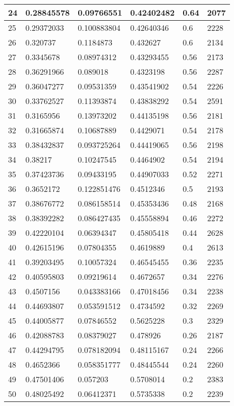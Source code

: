 \begin{longtable}{|l|l|l|l|l|l|}
24 & 0.28845578 & 0.09766551 & 0.42402482 & 0.64 & 2077 \\ \hline 
25 & 0.29372033 & 0.100883804 & 0.42640346 & 0.6 & 2228 \\ \hline 
26 & 0.320737 & 0.1184873 & 0.432627 & 0.6 & 2134 \\ \hline 
27 & 0.3345678 & 0.08974312 & 0.43293455 & 0.56 & 2173 \\ \hline 
28 & 0.36291966 & 0.089018 & 0.4323198 & 0.56 & 2287 \\ \hline 
29 & 0.36047277 & 0.09531359 & 0.43541902 & 0.54 & 2226 \\ \hline 
30 & 0.33762527 & 0.11393874 & 0.43838292 & 0.54 & 2591 \\ \hline 
31 & 0.3165956 & 0.13973202 & 0.44135198 & 0.56 & 2181 \\ \hline 
32 & 0.31665874 & 0.10687889 & 0.4429071 & 0.54 & 2178 \\ \hline 
33 & 0.38432837 & 0.093725264 & 0.44419065 & 0.56 & 2198 \\ \hline 
34 & 0.38217 & 0.10247545 & 0.4464902 & 0.54 & 2194 \\ \hline 
35 & 0.37423736 & 0.09433195 & 0.44907033 & 0.52 & 2271 \\ \hline 
36 & 0.3652172 & 0.122851476 & 0.4512346 & 0.5 & 2193 \\ \hline 
37 & 0.38676772 & 0.086158514 & 0.45353436 & 0.48 & 2168 \\ \hline 
38 & 0.38392282 & 0.086427435 & 0.45558894 & 0.46 & 2272 \\ \hline 
39 & 0.42220104 & 0.06394347 & 0.45805418 & 0.44 & 2628 \\ \hline 
40 & 0.42615196 & 0.07804355 & 0.4619889 & 0.4 & 2613 \\ \hline 
41 & 0.39203495 & 0.10057324 & 0.46545455 & 0.36 & 2235 \\ \hline 
42 & 0.40595803 & 0.09219614 & 0.4672657 & 0.34 & 2276 \\ \hline 
43 & 0.4507156 & 0.043383166 & 0.47018456 & 0.34 & 2238 \\ \hline 
44 & 0.44693807 & 0.053591512 & 0.4734592 & 0.32 & 2269 \\ \hline 
45 & 0.44005877 & 0.07846552 & 0.5625228 & 0.3 & 2329 \\ \hline 
46 & 0.42088783 & 0.08379027 & 0.478926 & 0.26 & 2187 \\ \hline 
47 & 0.44294795 & 0.078182094 & 0.48115167 & 0.24 & 2266 \\ \hline 
48 & 0.4652366 & 0.058351777 & 0.48445544 & 0.24 & 2260 \\ \hline 
49 & 0.47501406 & 0.057203 & 0.5708014 & 0.2 & 2383 \\ \hline 
50 & 0.48025492 & 0.06412371 & 0.5735338 & 0.2 & 2239 \\ \hline 
\end{longtable}